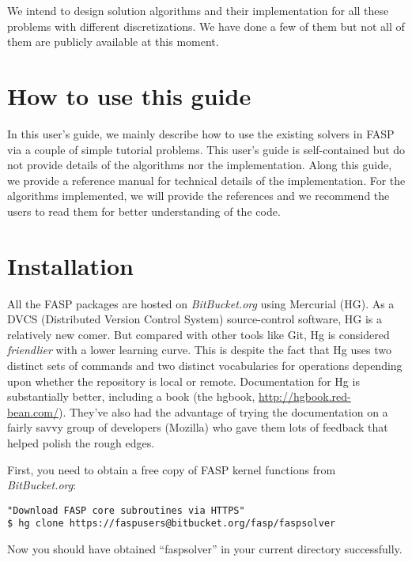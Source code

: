 \documentclass[11pt]{memoir}
\begin{document}
We intend to design solution algorithms and their implementation for all these problems with different discretizations. We have done a few of them but not all of them are publicly available at this moment. 


\section{How to use this guide}\label{sec:how}

In this user's guide, we mainly describe how to use the existing solvers in FASP via a couple of simple tutorial problems. This user's guide is self-contained but do not provide details of the algorithms nor the implementation. Along this guide, we provide a reference manual for technical details of the implementation. For the algorithms implemented, we will provide the references and we recommend the users to read them for better understanding of the code. 


\section{Installation}\label{sec:install}

All the FASP packages are hosted on \emph{BitBucket.org} using Mercurial (HG). As a DVCS (Distributed Version Control System) source-control software, HG is a relatively new comer. But compared with other tools like Git, Hg is considered \emph{friendlier} with a lower learning curve. This is despite the fact that Hg uses two distinct sets of commands and two distinct vocabularies for operations depending upon whether the repository is local or remote.
Documentation for Hg is substantially better, including a book (the hgbook, \url{http://hgbook.red-bean.com/}). They've also had the advantage of trying the documentation on a fairly savvy group of developers (Mozilla) who gave them lots of feedback that helped polish the rough edges.

First, you need to obtain a free copy of FASP kernel functions from \emph{BitBucket.org}:
%
\begin{lstlisting}[numbers=none]
"Download FASP core subroutines via HTTPS"
$ hg clone https://faspusers@bitbucket.org/fasp/faspsolver
\end{lstlisting}
%
Now you should have obtained ``faspsolver'' in your current directory successfully. 
\end{document}
